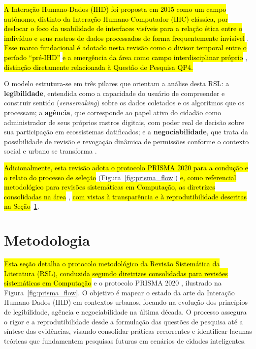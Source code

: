 \documentclass[12pt]{article}
\newcommand{\hlcite}[1]{\colorbox{yellow}{\cite{#1}}} %
\begin{document}
\hl{A Interação Humano-Dados (IHD) foi proposta em 2015 como um campo autônomo, distinto da Interação Humano-Computador (IHC) clássica, por deslocar o foco da usabilidade de interfaces visíveis para a relação ética entre o indivíduo e seus rastros de dados processados de forma frequentemente invisível} \hlcite{mortier2015humandatainteractionhumanface}. \hl{Esse marco fundacional é adotado nesta revisão como o divisor temporal entre o período ``pré-IHD''} \hlcite{Mashhadi2014} \hl{e a emergência da área como campo interdisciplinar próprio} \hlcite{Sailaja2021Designing}, \hl{distinção diretamente relacionada à Questão de Pesquisa QP4.}

O modelo estrutura-se em três pilares que orientam a análise desta RSL: a \textbf{legibilidade}, entendida como a capacidade do usuário de compreender e construir sentido (\textit{sensemaking}) sobre os dados coletados e os algoritmos que os processam; a \textbf{agência}, que corresponde ao papel ativo do cidadão como administrador de seus próprios rastros digitais, com poder real de decisão sobre sua participação em ecossistemas datificados; e a \textbf{negociabilidade}, que trata da possibilidade de revisão e revogação dinâmica de permissões conforme o contexto social e urbano se transforma \hlcite{mortier2015humandatainteractionhumanface}.

\hl{Adicionalmente, esta revisão adota o protocolo PRISMA 2020 para a condução e o relato do processo de seleção} (Figura~\ref{fig:prisma_flow}) \hl{e, como referencial metodológico para revisões sistemáticas em Computação, as diretrizes consolidadas na área} \hlcite{KITCHENHAM2013}, \hl{com vistas à transparência e à reprodutibilidade descritas na Seção}~\ref{sec:metodologia}.

\section{Metodologia} \label{sec:metodologia}

    \hl{Esta seção detalha o protocolo metodológico da Revisão Sistemática da Literatura (RSL), conduzida segundo diretrizes consolidadas para revisões sistemáticas em Computação} \hlcite{KITCHENHAM2013} e o protocolo PRISMA 2020 \hlcite{prisma2021}, ilustrado na Figura~\ref{fig:prisma_flow}. O objetivo é mapear o estado da arte da Interação Humano-Dados (IHD) em contextos urbanos, focando na evolução dos princípios de legibilidade, agência e negociabilidade na última década. O processo assegura o rigor e a reprodutibilidade desde a formulação das questões de pesquisa até a síntese das evidências, visando consolidar práticas recorrentes e identificar lacunas teóricas que fundamentem pesquisas futuras em cenários de cidades inteligentes.
\end{document}
